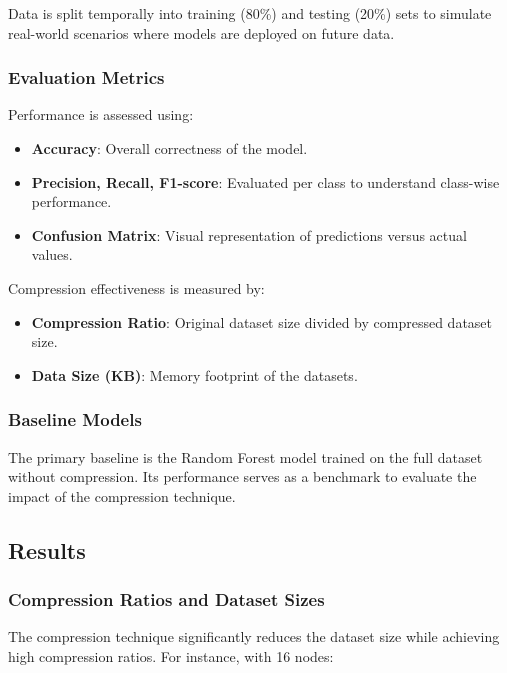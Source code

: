 \documentclass{article}
\begin{document}
Data is split temporally into training (80\%) and testing (20\%) sets to simulate real-world scenarios where models are deployed on future data.

\subsubsection{Evaluation Metrics}

Performance is assessed using:

\begin{itemize}
    \item \textbf{Accuracy}: Overall correctness of the model.
    \item \textbf{Precision, Recall, F1-score}: Evaluated per class to understand class-wise performance.
    \item \textbf{Confusion Matrix}: Visual representation of predictions versus actual values.
\end{itemize}

Compression effectiveness is measured by:

\begin{itemize}
    \item \textbf{Compression Ratio}: Original dataset size divided by compressed dataset size.
    \item \textbf{Data Size (KB)}: Memory footprint of the datasets.
\end{itemize}

\subsubsection{Baseline Models}

The primary baseline is the Random Forest model trained on the full dataset without compression. Its performance serves as a benchmark to evaluate the impact of the compression technique.

\subsection{Results}

\subsubsection{Compression Ratios and Dataset Sizes}

The compression technique significantly reduces the dataset size while achieving high compression ratios. For instance, with 16 nodes:
\end{document}
